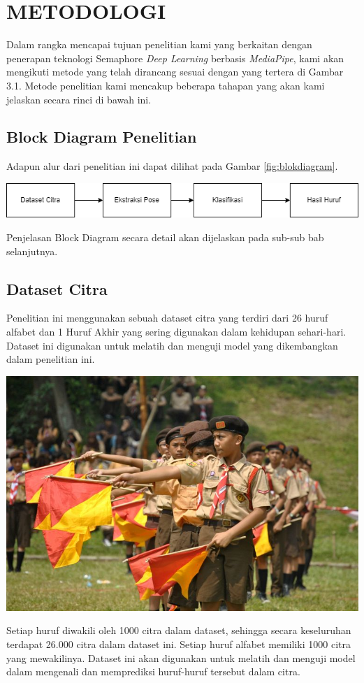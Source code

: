 \chapter{METODOLOGI}


Dalam rangka mencapai tujuan penelitian kami yang berkaitan dengan penerapan teknologi Semaphore \textit{Deep Learning} berbasis \textit{MediaPipe}, kami akan mengikuti metode yang telah dirancang sesuai dengan yang tertera di Gambar 3.1. Metode penelitian kami mencakup beberapa tahapan yang akan kami jelaskan secara rinci di bawah ini.

\section{Block Diagram Penelitian}
Adapun alur dari penelitian ini dapat dilihat pada Gambar \ref{fig:blokdiagram}.
\begin{center}
	\includegraphics[width=0.9\linewidth]{gambar/metodologi_kerja.png}
	\label{fig:blokdiagram}
\end{center}

Penjelasan Block Diagram secara detail akan dijelaskan pada sub-sub bab selanjutnya.

\section{Dataset Citra}

Penelitian ini menggunakan sebuah dataset citra yang terdiri dari 26 huruf alfabet dan 1 Huruf Akhir yang sering digunakan dalam kehidupan sehari-hari. Dataset ini digunakan untuk melatih dan menguji model yang dikembangkan dalam penelitian ini.
\begin{center}
	\includegraphics[width=0.7\linewidth]{gambar/bener/kerja-semaphore.jpg}
	\label{fig:poseAbjadBISINDO}
\end{center}
Setiap huruf diwakili oleh 1000 citra dalam dataset, sehingga secara keseluruhan terdapat 26.000 citra dalam dataset ini. Setiap huruf alfabet memiliki 1000 citra yang mewakilinya. Dataset ini akan digunakan untuk melatih dan menguji model dalam mengenali dan memprediksi huruf-huruf tersebut dalam citra.


